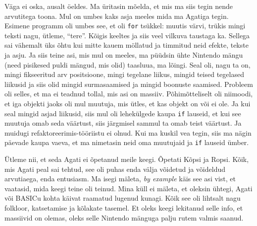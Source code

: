 Väga ei oska, ausalt öeldes. Ma üritasin mõelda, et mis ma siis tegin nende 
arvutitega toona. Mul on umbes kaks asja meeles mida ma Agatiga tegin. Esimene 
programm oli umbes see, et oli \verb|for| tsükkel: muutis värvi, trükis mingi 
teksti nagu, ütleme, \enquote{tere}. Kõigis keeltes ja siis veel vilkuva 
taustaga ka. Sellega sai vähemalt üks õhtu kui mitte kauem möllatud ja timmitud 
neid efekte, tekste ja asju. Ja siis teine asi, mis mul on meeles, ma püüdsin 
ühte Nintendo mängu (need pisikesed puldi mängud, mis olid) taasluua, ma 
lõingi. Seal oli, nagu ta on, mingi fikseeritud arv positsioone, mingi tegelane 
liikus, mingid teised tegelased liikusid ja siis olid mingid surmasaamised ja 
mingid boonuste saamised. Probleem oli selles, et ma ei teadnud tollal, mis asi 
on massiiv. Põhimõtteliselt oli niimoodi, et iga objekti jaoks oli mul muutuja, 
mis ütles, et kas objekt on või ei ole. Ja kui seal mingid asjad liikusid, siis 
mul oli lehekülgede kaupa \verb|if| lauseid, et kui see muutuja omab seda 
väärtust, siis järgmisel sammul ta omab teist väärtust. Ja muidugi 
refaktoreerimis-tööriistu ei olnud. Kui ma kuskil vea tegin, siis ma nägin 
päevade kaupa vaeva, et ma nimetasin neid oma muutujaid ja \verb|if| lauseid 
ümber.



Ütleme nii, et seda Agati ei õpetanud meile keegi. Õpetati 
Kõpsi ja Ropsi. Kõik, mis Agati peal sai tehtud, see oli puhas enda välja 
võidetud ja võideldud  arvutiaega, enda entusiasm. Ma isegi mäleta, \emph{by 
example} käis see asi vist, et vaatasid, mida keegi teine oli teinud. Mina küll 
ei mäleta, et oleksin ühtegi, Agati või BASICu  kohta 
käivat raamatud lugenud kunagi. Kõik see oli lihtsalt nagu folkloor, 
katsetamise ja kõlakate tasemel. Et oleks keegi lekitanud selle info, et 
massiivid on olemas, oleks selle Nintendo mänguga palju rutem valmis saanud. 

